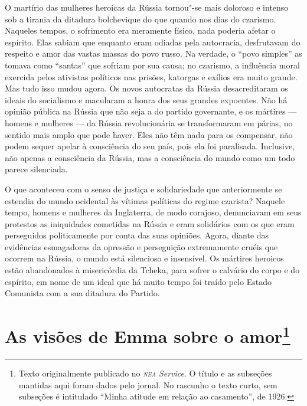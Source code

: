 O martírio das mulheres heroicas da Rússia tornou"-se mais doloroso e
intenso sob a tirania da ditadura bolchevique do que quando nos dias do
czarismo. Naqueles tempos, o sofrimento era meramente físico, nada
poderia afetar o espírito. Elas sabiam que enquanto eram odiadas pela
autocracia, desfrutavam do respeito e amor das vastas massas do povo
russo. Na verdade, o ``povo simples'' as tomava como ``santas'' que
sofriam por sua causa; no czarismo, a influência moral exercida pelos
ativistas políticos nas prisões, katorgas e exílios era muito grande.
Mas tudo isso mudou agora. Os novos autocratas da Rússia desacreditaram
os ideais do socialismo e macularam a honra dos seus grandes expoentes.
Não há opinião pública na Rússia que não seja a do partido governante, e
os mártires --- homens e mulheres --- da Rússia revolucionária se
transformaram em párias, no sentido mais amplo que pode haver. Eles não
têm nada para os compensar, não podem sequer apelar à consciência do seu
país, pois ela foi paralisada. Inclusive, não apenas a consciência da
Rússia, mas a consciência do mundo como um todo parece silenciada.

O que aconteceu com o senso de justiça e solidariedade que
anteriormente se estendia do mundo ocidental às vítimas políticas do
regime czarista? Naquele tempo, homens e mulheres da Inglaterra, de modo
corajoso, denunciavam em seus protestos as iniquidades cometidas na
Rússia e eram solidários com os que eram perseguidos politicamente por
conta das suas opiniões. Agora, diante das evidências esmagadoras da
opressão e perseguição extremamente cruéis que ocorrem na Rússia, o
mundo está silencioso e insensível. Os mártires heroicos estão
abandonados à misericórdia da Tcheka, para sofrer o calvário do corpo e
do espírito, em nome de um ideal que há muito tempo foi traído pelo
Estado Comunista com a sua ditadura do Partido.

\chapter{As visões de Emma sobre o amor\footnote{Texto originalmente publicado no
  \emph{\textsc{nea} Service}. O título e as subseções mantidas
  aqui foram dados pelo jornal. No rascunho o texto curto, sem
  subseções é intitulado ``Minha atitude em relação ao casamento'', de 1926.}}


